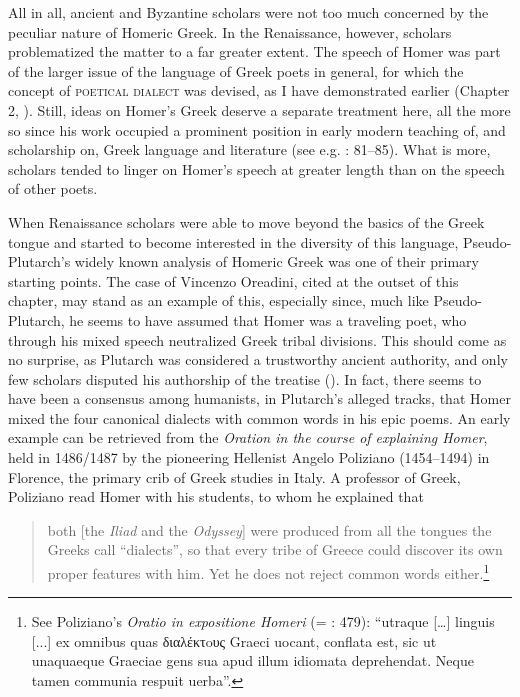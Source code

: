 All in all, ancient and Byzantine scholars were not too much concerned by the peculiar nature of Homeric Greek. In the Renaissance, however, scholars problematized the matter to a far greater extent. The speech of Homer was part of the larger issue of the language of Greek poets in general, for which the concept of \textsc{poetical} \textsc{dialect} was devised, as I have demonstrated earlier (Chapter 2, ). Still, ideas on Homer’s Greek deserve a separate treatment here, all the more so since his work occupied a prominent position in early modern teaching of, and scholarship on, Greek language and literature (see e.g. \citealt{Botley2010}: 81–85). What is more, scholars tended to linger on Homer’s speech at greater length than on the speech of other poets.

When Renaissance scholars were able to move beyond the basics of the Greek tongue and started to become interested in the diversity of this language, Pseudo-Plutarch’s widely known analysis of Homeric Greek was one of their primary starting points. The case of Vincenzo Oreadini, cited at the outset of this chapter, may stand as an example of this, especially since, much like Pseudo-Plutarch, he seems to have assumed that Homer was a traveling poet, who through his mixed speech neutralized Greek tribal divisions. This should come as no surprise, as Plutarch was considered a trustworthy ancient authority, and only few scholars disputed his authorship of the treatise (\citealt{VanRooy2018c}). In fact, there seems to have been a consensus among humanists, in Plutarch’s alleged tracks, that Homer mixed the four canonical dialects with common words in his epic poems. An early example can be retrieved from the \textit{Oration in the course of explaining Homer}, held in 1486/1487 by the pioneering Hellenist Angelo Poliziano (1454–1494) in Florence, the primary crib of Greek studies in Italy. A professor of Greek, Poliziano read Homer with his students, to whom he explained that

\begin{quote}
both [the \textit{Iliad} and the \textit{Odyssey}] were produced from all the tongues the Greeks call “dialects”, so that every tribe of Greece could discover its own proper features with him. Yet he does not reject common words either.\footnote{See Poliziano’s \textit{Oratio in expositione Homeri} (= \citealt{Poliziano1553}: 479): “utraque […] linguis [...] ex omnibus quas διαλέκτoυς Graeci uocant, conflata est, sic ut unaquaeque Graeciae gens sua apud illum idiomata deprehendat. Neque tamen communia respuit uerba”.}
\end{quote}

